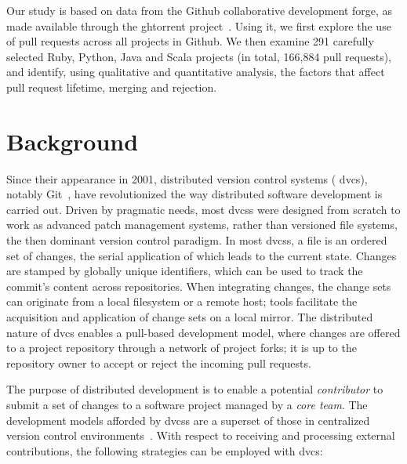 \documentclass{sig-alternate}
\begin{document}
Our study is based on data from the Github collaborative development forge, as
made available through the {\sc ght}orrent project~\cite{GS12}. Using it, we
first explore the use of pull requests across all projects in Github. We then
examine 291 carefully selected Ruby, Python, Java and Scala projects (in total,
166,884 pull requests), and identify, using  
qualitative and quantitative analysis, the
factors that affect pull request lifetime, merging and rejection. 

\section{Background} \label{sec:bg}

Since their appearance in 2001, distributed version control systems ({\sc
dvcs}), notably Git~\cite{Chaco09}, have revolutionized the way distributed
software development is carried out. Driven by pragmatic needs, most {\sc dvcs}s
were designed from scratch to work as advanced patch management systems, rather
than versioned file systems, the then dominant version control paradigm. In most
{\sc dvcs}s, a file is an ordered set of changes, the serial application of
which leads to the current state. Changes are stamped by globally unique
identifiers, which can be used to track the commit's content across
repositories. When integrating changes, the change sets can originate from a
local filesystem or a remote host; tools facilitate the acquisition and
application of change sets on a local mirror. The distributed nature of {\sc
dvcs} enables a pull-based development model, where changes are offered to a
project repository through a network of project forks; it is up to the
repository owner to accept or reject the incoming pull requests.

The purpose of distributed development is to enable a potential
\emph{contributor} to submit a set of changes to a software project managed by a
\emph{core team}. The development models afforded by {\sc dvcs}s are a superset
of those in centralized version control environments~\cite{Shiha12,Bird09}.
With respect to receiving and processing external contributions, the following
strategies can be employed with {\sc dvc}s:
\end{document}

